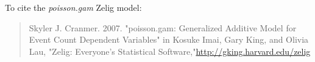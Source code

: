 To cite the \emph{ poisson.gam } Zelig model:
 \begin{verse}
 Skyler J. Cranmer. 2007. "poisson.gam: Generalized Additive Model for Event Count Dependent Variables" in Kosuke Imai, Gary King, and Olivia Lau, "Zelig: Everyone's Statistical Software,"\url{http://gking.harvard.edu/zelig} 
\end{verse}